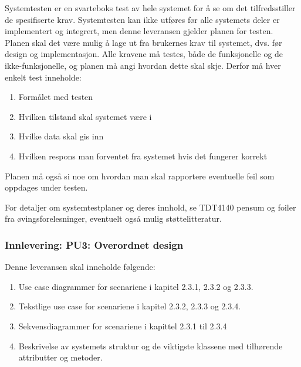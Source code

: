 Systemtesten er en svarteboks test av hele systemet for å se om det tilfredsstiller de spesifiserte krav. Systemtesten kan ikke utføres før alle systemets deler er implementert og integrert, men denne leveransen gjelder planen for testen. Planen skal det være mulig å lage ut fra brukernes krav til systemet, dvs. før design og implementasjon. Alle kravene må testes, både de funksjonelle og de ikke-funksjonelle, og planen må angi hvordan dette skal skje. Derfor må hver enkelt test inneholde:

\begin{enumerate}

\item
Formålet med testen

\item
Hvilken tilstand skal systemet være i

\item
Hvilke data skal gis inn

\item
Hvilken respons man forventet fra systemet hvis det fungerer korrekt

\end{enumerate}

Planen må også si noe om hvordan man skal rapportere eventuelle feil som oppdages under testen.

For detaljer om systemtestplaner og deres innhold, se TDT4140 pensum og foiler fra øvingsforelesninger, eventuelt også mulig støttelitteratur.

\subsubsection{Innlevering: PU3: Overordnet design}

Denne leveransen skal inneholde følgende:

\begin{enumerate}

\item
Use case diagrammer for scenariene i kapitel 2.3.1, 2.3.2 og 2.3.3.

\item
Tekstlige use case for scenariene i kapitel 2.3.2, 2.3.3 og 2.3.4.

\item
Sekvensdiagrammer for scenariene i kapittel 2.3.1 til 2.3.4

\item
Beskrivelse av systemets struktur og de viktigste klassene med tilhørende attributter og metoder.

\end{enumerate}

